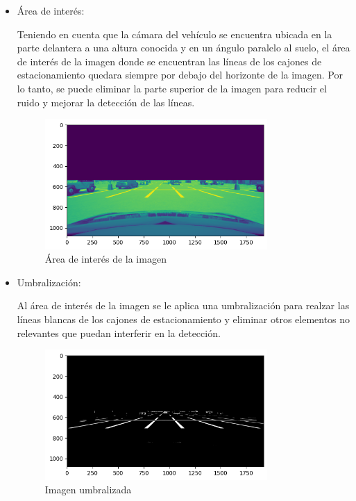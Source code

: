 \begin{itemize}
    \item Área de interés:

    Teniendo en cuenta que la cámara del vehículo se encuentra ubicada en la parte delantera a una altura conocida y en un ángulo paralelo al suelo, el área de interés de la imagen donde se encuentran las líneas de los cajones de estacionamiento quedara siempre por debajo del horizonte de la imagen.
    Por lo tanto, se puede eliminar la parte superior de la imagen para
    reducir el ruido y mejorar la detección de las líneas.
    \begin{figure}[!ht]
        \centering
        \includegraphics[width=0.8\textwidth]{img/reticule/horizont}
        \caption{Área de interés de la imagen}
        \label{fig:roi}
    \end{figure}

    \item Umbralización:

    Al área de interés de la imagen se le aplica una umbralización para realzar las líneas blancas de los cajones de estacionamiento y eliminar otros elementos no relevantes que puedan interferir en la detección.
    \begin{figure}[!ht]
        \centering
        \includegraphics[width=0.8\textwidth]{img/reticule/thresholded}
        \caption{Imagen umbralizada}
        \label{fig:threshold}
    \end{figure}


\end{itemize}
